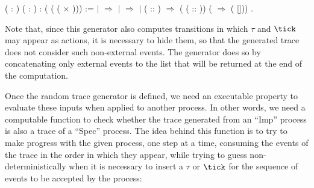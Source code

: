 \begin{coqdoccode}
	\coqdocnoindent
	 \coqdoceol
	\coqdocindent{1.00em}
	( : )\coqdoceol
	\coqdocindent{1.00em}
	( : )\coqdoceol
	\coqdocindent{1.00em}
	:  ( ( ( \ensuremath{\times} ))) :=\coqdoceol
	\coqdocindent{1.00em}
	    \coqdoceol
	\coqdocindent{1.00em}
	\ensuremath{|}  \ensuremath{\Rightarrow}  \coqdoceol
	\coqdocindent{1.00em}
	\ensuremath{|}   \ensuremath{\Rightarrow}  \coqdoceol
	\coqdocindent{1.00em}
	\ensuremath{|}  ( :: ) \ensuremath{\Rightarrow}  (  ( :: )) (  \ensuremath{\Rightarrow}  ( []))\coqdoceol
	\coqdocindent{1.00em}
	.\coqdoceol
\end{coqdoccode}

Note that, since this generator also computes transitions in which $ \tau $ and $ \tick $ may appear as actions, it is necessary to hide them, so that the generated trace does not consider such non-external events. The generator  does so by concatenating only external events to the list that will be returned at the end of the computation.

Once the random trace generator is defined, we need an executable property to evaluate these inputs when applied to another process. In other words, we need a computable function to check whether the trace generated from an ``Imp'' process is also a trace of a ``Spec'' process. The idea behind this function is to try to make progress with the given process, one step at a time, consuming the events of the trace in the order in which they appear, while trying to guess non-deterministically when it is necessary to insert a $ \tau $ or $ \tick $ for the sequence of events to be accepted by the process:

